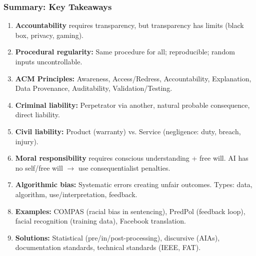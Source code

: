 \bigseparator

\subsubsection{Summary: Key Takeaways}

\begin{keybox}
\begin{enumerate}
  \item \textbf{Accountability} requires transparency, but transparency has limits (black box, privacy, gaming).
  \item \textbf{Procedural regularity:} Same procedure for all; reproducible; random inputs uncontrollable.
  \item \textbf{ACM Principles:} Awareness, Access/Redress, Accountability, Explanation, Data Provenance, Auditability, Validation/Testing.
  \item \textbf{Criminal liability:} Perpetrator via another, natural probable consequence, direct liability.
  \item \textbf{Civil liability:} Product (warranty) vs. Service (negligence: duty, breach, injury).
  \item \textbf{Moral responsibility} requires conscious understanding + free will. AI has no self/free will $\to$ use consequentialist penalties.
  \item \textbf{Algorithmic bias:} Systematic errors creating unfair outcomes. Types: data, algorithm, use/interpretation, feedback.
  \item \textbf{Examples:} COMPAS (racial bias in sentencing), PredPol (feedback loop), facial recognition (training data), Facebook translation.
  \item \textbf{Solutions:} Statistical (pre/in/post-processing), discursive (AIAs), documentation standards, technical standards (IEEE, FAT).
\end{enumerate}
\end{keybox}

